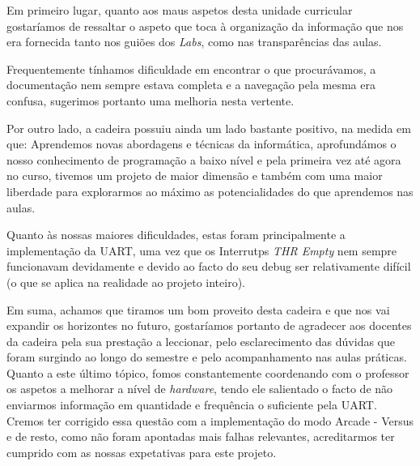 \documentclass{report}
\begin{document}
Em primeiro lugar, quanto aos maus aspetos desta unidade curricular gostaríamos de ressaltar o aspeto que toca à organização da informação que nos era fornecida tanto nos guiões dos \textit{Labs}, como nas transparências das aulas. 

Frequentemente tínhamos dificuldade em encontrar o que procurávamos, a documentação nem sempre estava completa e a navegação pela mesma era confusa, sugerimos portanto uma melhoria nesta vertente.

Por outro lado, a cadeira possuiu ainda um lado bastante positivo, na medida em que: Aprendemos novas abordagens e técnicas da informática, aprofundámos o nosso conhecimento de programação a baixo nível e pela primeira vez até agora no curso, tivemos um projeto de maior dimensão e também com uma maior liberdade para explorarmos ao máximo as potencialidades do que aprendemos nas aulas.

Quanto às nossas maiores dificuldades, estas foram principalmente a implementação da UART, uma vez que os Interrutps \textit{THR Empty} nem sempre funcionavam devidamente e devido ao facto do seu debug ser relativamente difícil (o que se aplica na realidade ao projeto inteiro).

Em suma, achamos que tiramos um bom proveito desta cadeira e que nos vai expandir os horizontes no futuro, gostaríamos portanto de agradecer aos docentes da cadeira pela sua prestação a leccionar, pelo esclarecimento das dúvidas que foram surgindo ao longo do semestre e pelo acompanhamento nas aulas práticas. Quanto a este último tópico, fomos constantemente coordenando com o professor os aspetos a melhorar a nível de \textit{hardware}, tendo ele salientado o facto de não enviarmos informação em quantidade e frequência o suficiente pela UART. Cremos ter corrigido essa questão com a implementação do modo Arcade - Versus e de resto, como não foram apontadas mais falhas relevantes, acreditarmos ter cumprido com as nossas expetativas para este projeto.

\paragraph{}
\end{document}

